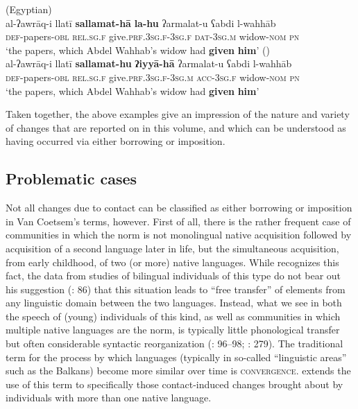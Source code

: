 \documentclass[output=paper]{langsci/langscibook}
\begin{document}
\ea
\label{introwilmsen1} ({Egyptian})\\
\gll al-ʔawrāq-i llatī \textbf{sallamat-hā} \textbf{la-hu} ʔarmalat-u ʕabdi l-wahhāb\\
     \textsc{def}{}-papers-\textsc{obl} \textsc{rel.sg.f} give.\textsc{prf.3sg.f-3sg.f} \textsc{dat-3sg.m} widow-\textsc{nom} \textsc{pn}\\
     \glt ‘the papers, which Abdel Wahhab’s widow had \textbf{given} \textbf{him}’
\ex \label{introwilmsen2} ()\\
\gll al-ʔawrāq-i llatī \textbf{sallamat-hu} \textbf{ʔiyyā-hā} ʔarmalat-u ʕabdi l-wahhāb\\
     \textsc{def}{}-papers-\textsc{obl} \textsc{rel.sg.f} give.\textsc{prf.3sg.f-3sg.m} \textsc{acc-3sg.f} widow-\textsc{nom} \textsc{pn}\\
\glt ‘the papers, which Abdel Wahhab’s widow had \textbf{given} \textbf{him}’\z

Taken together, the above examples give an impression of the nature and variety of changes that are reported on in this volume, and which can be understood as having occurred via either borrowing or {imposition}.

\subsection{Problematic cases}\label{introproblem}

Not all changes due to contact can be classified as either borrowing or {imposition} in Van Coetsem's terms, however. First of all, there is the rather frequent case of communities in which the norm is not {monolingual} native acquisition followed by acquisition of a second language later in life, but the simultaneous acquisition, from early childhood, of two (or more) native languages. While \citet{VanCoetsem2000} recognizes this fact, the data from studies of bilingual individuals of this type do not bear out his suggestion (\citeyear{VanCoetsem2000}: 86) that this situation leads to ``free {transfer}'' of elements from any linguistic domain between the two languages. Instead, what we see in both the speech of (young) individuals of this kind, as well as communities in which multiple native languages are the norm, is typically little phonological {transfer} but often considerable syntactic reorganization (\citealt{Lucas2009}: 96--98; \citeyear{Lucas2012}: 279). The traditional term for the process by which languages (typically in so-called ``linguistic areas'' such as the Balkans) become more similar over time is \textsc{convergence}. \citet{Lucas2015} extends the use of this term to specifically those contact-induced changes brought about by individuals with more than one native language.
\end{document}
